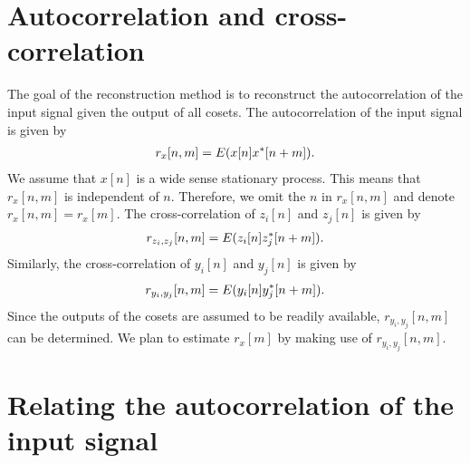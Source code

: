 \documentclass[a4paper, openany, oneside]{memoir}
\begin{document}
\section{Autocorrelation and cross-correlation}
The goal of the reconstruction method is to reconstruct the autocorrelation of the input signal given the output of all cosets. The autocorrelation of the input signal is given by
\begin{align*}
    r_x[n,m] = E(x[n]x^*[n+m]).
\end{align*}
We assume that $x[n]$ is a wide sense stationary process. This means that $r_x[n,m]$ is independent of $n$. Therefore, we omit the $n$ in $r_x[n,m]$ and denote $r_x[n,m]=r_x[m]$. The cross-correlation of $z_i[n]$ and $z_j[n]$ is given by
\begin{align*}
    r_{z_i,z_j}[n,m]=E(z_i[n]z^*_j[n+m]).
\end{align*}
Similarly, the cross-correlation of $y_i[n]$ and $y_j[n]$ is given by
\begin{align*}
    r_{y_i,y_j}[n,m]=E(y_i[n]y^*_j[n+m]).
\end{align*}
Since the outputs of the cosets are assumed to be readily available, $r_{y_i,y_j}[n,m]$ can be determined. We plan to estimate $r_x[m]$ by making use of $r_{y_i,y_j}[n,m]$.

\section{Relating the autocorrelation of the input signal}
\end{document}
